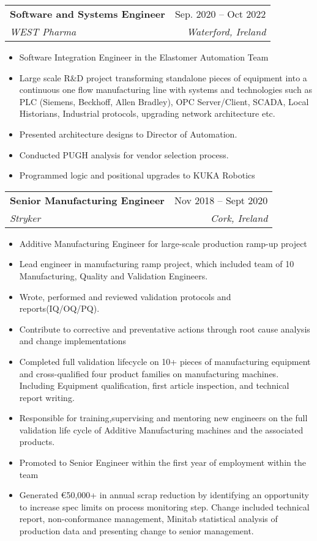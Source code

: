 \documentclass[letterpaper,11pt]{article}
\makeatletter
\newcommand{\resumeItem}[1]{
  \item\small{
    {#1 \vspace{-2pt}}
  }
}
\newcommand{\resumeSubheading}[4]{
  \vspace{-2pt}\item
    \begin{tabular*}{0.97\textwidth}[t]{l@{\extracolsep{\fill}}r}
      \textbf{#1} & #2 \\
      \textit{\small#3} & \textit{\small #4} \\
    \end{tabular*}\vspace{-7pt}
}
\newcommand{\resumeSubSubheading}[2]{
    \item
    \begin{tabular*}{0.97\textwidth}{l@{\extracolsep{\fill}}r}
      \textit{\small#1} & \textit{\small #2} \\
    \end{tabular*}\vspace{-7pt}
}
\newcommand{\resumeSubHeadingListEnd}{\end{itemize}}
\newcommand{\resumeItemListStart}{\begin{itemize}}
\newcommand{\resumeItemListEnd}{\end{itemize}\vspace{-5pt}}
\makeatother
\begin{document}

    \resumeSubheading
      {Software and Systems Engineer}{Sep. 2020 -- Oct 2022}
      {WEST Pharma}{Waterford, Ireland}
      \resumeItemListStart
        \resumeItem{Software Integration Engineer in the Elastomer Automation Team}
        \resumeItem{Large scale R\&D project transforming standalone pieces of equipment into a continuous one flow manufacturing line with systems and technologies such as PLC (Siemens, Beckhoff, Allen Bradley), OPC Server/Client, SCADA, Local Historians, Industrial protocols, upgrading network architecture etc.}
        \resumeItem{Presented architecture designs to Director of Automation.}
        \resumeItem{Conducted PUGH analysis for vendor selection process.}
        \resumeItem{Programmed logic and positional upgrades to KUKA Robotics}
    \resumeItemListEnd

    \resumeSubheading
      {Senior Manufacturing Engineer}{Nov 2018 -- Sept 2020}
      {Stryker}{Cork, Ireland}
      \resumeItemListStart
        \resumeItem{Additive Manufacturing Engineer for large-scale production ramp-up project}
        \resumeItem{Lead engineer in manufacturing ramp project, which included team of 10 Manufacturing, Quality and Validation Engineers.}
        \resumeItem{Wrote, performed and reviewed validation protocols and reports(IQ/OQ/PQ).}
        \resumeItem{Contribute to corrective and preventative actions through root cause analysis and change implementations}
        \resumeItem{Completed full validation lifecycle on 10+ pieces of manufacturing equipment and cross-qualified four product families on manufacturing machines. Including Equipment qualification, first article inspection, and technical report writing.}
        \resumeItem{Responsible for training,supervising and mentoring new engineers on the full validation life cycle of Additive Manufacturing machines and the associated products.}
        \resumeItem{Promoted to Senior Engineer within the first year of employment within the team}
        \resumeItem{Generated €50,000+ in annual scrap reduction by identifying an opportunity to increase spec limits on process monitoring step.
        Change included technical report, non-conformance management, Minitab statistical analysis of production data and presenting change to senior management.}
  \resumeSubHeadingListEnd
\end{document}
